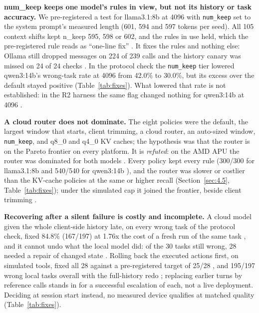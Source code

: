 \documentclass[conference,10pt]{IEEEtran}
\begin{document}
\textbf{num\_keep keeps one model's rules in view, but not its history or task accuracy.} We pre-registered a test for llama3.1:8b at 4096 with \texttt{num\_keep} set to the system prompt's measured length (601, 594 and 597 tokens per seed). All 105 context shifts kept n\_keep 595, 598 or 602, and the rules in use held, which the pre-registered rule reads as ``one-line fix''%
. It fixes the rules and nothing else: Ollama still dropped messages on 224 of 239 calls and the history canary was missed on 24 of 24 checks%
. In the protocol check the \texttt{num\_keep} tier lowered qwen3:14b's wrong-task rate at 4096 from 42.0\% to 30.0\%, but its excess over the default stayed positive %
(Table~\ref{tab:fixes}). What lowered that rate is not established: in the R2 harness the same flag changed nothing for qwen3:14b at 4096%
.

\textbf{A cloud router does not dominate.} The eight %
policies were the default, the largest window that starts, client trimming, a cloud router, an auto-sized window, \texttt{num\_keep}, and q8\_0 and q4\_0 KV caches; the hypothesis was that the router is on the Pareto frontier on every platform. It is \emph{refuted}: on the AMD APU the router was dominated for both models%
. Every policy kept every rule (300/300 for llama3.1:8b and 540/540 for qwen3:14b%
), and the router was slower or costlier than the KV-cache policies at the same or higher recall (Section~\ref{sec:4.5}, Table~\ref{tab:fixes}); under the simulated cap it joined the frontier, beside client trimming%
.

\textbf{Recovering after a silent failure is costly and incomplete.} A cloud model given the whole client-side history late, on every wrong task of the protocol check, fixed 84.8\% (167/197) %
at 1.76x the cost of a fresh run of the same task%
, and it cannot undo what the local model did: of the 30 tasks still wrong, 28 needed a repair of changed state%
. Rolling back the executed actions first, on simulated tools, fixed all 28 against a pre-registered target of 25/28%
, and 195/197 wrong local tasks overall with the full-history redo%
; replacing earlier turns by reference calls stands in for a successful escalation of each, not a live deployment. Deciding at session start instead, no measured device qualifies at matched quality %
(Table~\ref{tab:fixes}).
\end{document}
